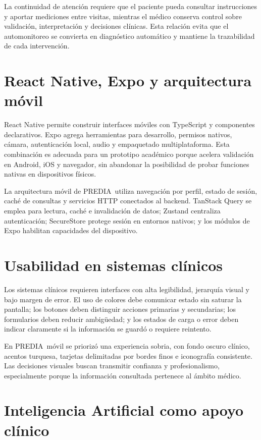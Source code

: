 \documentclass[12pt,letterpaper]{report}
\newcommand{\projectname}{PREDIA}
\begin{document}
La continuidad de atención requiere que el paciente pueda consultar instrucciones y aportar mediciones entre visitas, mientras el médico conserva control sobre validación, interpretación y decisiones clínicas. Esta relación evita que el automonitoreo se convierta en diagnóstico automático y mantiene la trazabilidad de cada intervención.

\section{React Native, Expo y arquitectura móvil}

React Native permite construir interfaces móviles con TypeScript y componentes declarativos. Expo agrega herramientas para desarrollo, permisos nativos, cámara, autenticación local, audio y empaquetado multiplataforma. Esta combinación es adecuada para un prototipo académico porque acelera validación en Android, iOS y navegador, sin abandonar la posibilidad de probar funciones nativas en dispositivos físicos.

La arquitectura móvil de \projectname\ utiliza navegación por perfil, estado de sesión, caché de consultas y servicios HTTP conectados al backend. TanStack Query se emplea para lectura, caché e invalidación de datos; Zustand centraliza autenticación; SecureStore protege sesión en entornos nativos; y los módulos de Expo habilitan capacidades del dispositivo.

\section{Usabilidad en sistemas clínicos}

Los sistemas clínicos requieren interfaces con alta legibilidad, jerarquía visual y bajo margen de error. El uso de colores debe comunicar estado sin saturar la pantalla; los botones deben distinguir acciones primarias y secundarias; los formularios deben reducir ambigüedad; y los estados de carga o error deben indicar claramente si la información se guardó o requiere reintento.

En \projectname\ móvil se priorizó una experiencia sobria, con fondo oscuro clínico, acentos turquesa, tarjetas delimitadas por bordes finos e iconografía consistente. Las decisiones visuales buscan transmitir confianza y profesionalismo, especialmente porque la información consultada pertenece al ámbito médico.

\section{Inteligencia Artificial como apoyo clínico}
\end{document}
